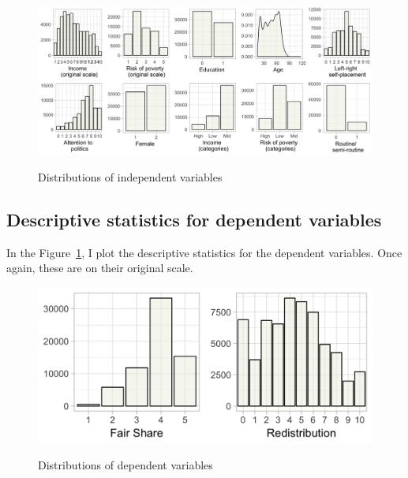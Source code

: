 \documentclass[12pt, letter]{scrartcl}
\begin{document}
\begin{figure}[H]
\centering
\caption{Distributions of independent variables}
\vspace{10pt}
\includegraphics[scale=0.15]{ic_desc.png}
\label{fig:desc}
\end{figure}

\subsection{Descriptive statistics for dependent variables}

In the Figure~\ref{fig:desc}, I plot the descriptive statistics for the dependent variables. Once again, these are on their original scale.

\begin{figure}[H]
\centering
\caption{Distributions of dependent variables}
\vspace{10pt}
\includegraphics[scale=0.15]{ic_desc2.png}
\label{fig:desc2}
\end{figure}

\printbibliography
\end{document}
